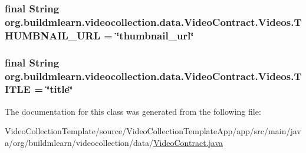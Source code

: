 \subsubsection[{\texorpdfstring{T\+H\+U\+M\+B\+N\+A\+I\+L\+\_\+\+U\+RL}{THUMBNAIL_URL}}]{\setlength{\rightskip}{0pt plus 5cm}final String org.\+buildmlearn.\+videocollection.\+data.\+Video\+Contract.\+Videos.\+T\+H\+U\+M\+B\+N\+A\+I\+L\+\_\+\+U\+RL = \char`\"{}thumbnail\+\_\+url\char`\"{}\hspace{0.3cm}{\ttfamily [static]}}\hypertarget{classorg_1_1buildmlearn_1_1videocollection_1_1data_1_1VideoContract_1_1Videos_a284dda519320b4413fd862060d06437f}{}\label{classorg_1_1buildmlearn_1_1videocollection_1_1data_1_1VideoContract_1_1Videos_a284dda519320b4413fd862060d06437f}
\subsubsection[{\texorpdfstring{T\+I\+T\+LE}{TITLE}}]{\setlength{\rightskip}{0pt plus 5cm}final String org.\+buildmlearn.\+videocollection.\+data.\+Video\+Contract.\+Videos.\+T\+I\+T\+LE = \char`\"{}title\char`\"{}\hspace{0.3cm}{\ttfamily [static]}}\hypertarget{classorg_1_1buildmlearn_1_1videocollection_1_1data_1_1VideoContract_1_1Videos_a65bcfcb2a263a861f0ff3986405ccfa3}{}\label{classorg_1_1buildmlearn_1_1videocollection_1_1data_1_1VideoContract_1_1Videos_a65bcfcb2a263a861f0ff3986405ccfa3}


The documentation for this class was generated from the following file\+:\begin{DoxyCompactItemize}
\item 
Video\+Collection\+Template/source/\+Video\+Collection\+Template\+App/app/src/main/java/org/buildmlearn/videocollection/data/\hyperlink{VideoContract_8java}{Video\+Contract.\+java}\end{DoxyCompactItemize}
